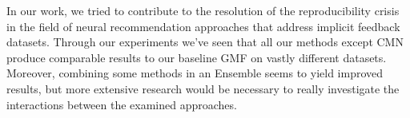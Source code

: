 In our work, we tried to contribute to the resolution of the reproducibility crisis in the field of neural recommendation approaches that address implicit feedback datasets. 
Through our experiments we've seen that all our methods except CMN produce comparable results to our baseline GMF on vastly different datasets. 
Moreover, combining some methods in an Ensemble seems to yield improved results, but more extensive research would be necessary to really investigate the interactions between the examined approaches.
